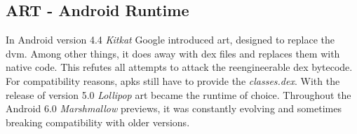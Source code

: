 \subsection{ART - Android Runtime} \label{subsection:android-art}
In Android version 4.4 \textit{Kitkat} Google introduced \gls{art}, designed to replace the \gls{dvm}.
Among other things, it does away with \gls{dex} files and replaces them with native code.
This refutes all attempts to attack the reengineerable dex bytecode.
For compatibility reasons, \gls{apk}s still have to provide the \textit{classes.dex}.
With the release of version 5.0 \textit{Lollipop} \gls{art} became the runtime of choice.
Throughout the Android 6.0 \textit{Marshmallow} previews, it was constantly evolving and sometimes breaking compatibility with older versions. \cite{andevconDalvikART} \cite{androidArt}
